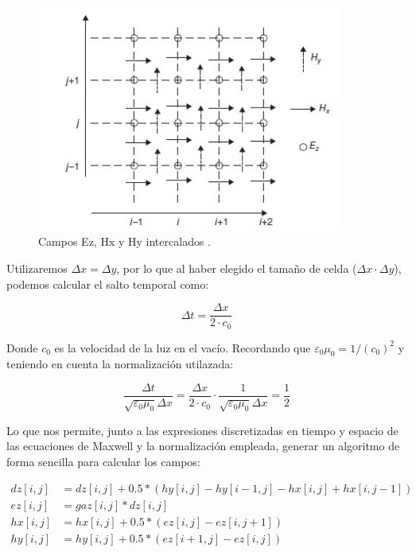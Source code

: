 \documentclass[11pt,a4paper,twoside,pdf]{article}
\numberwithin{equation}{section}
\begin{document}
\begin{figure}[h]
\centering
\includegraphics[width=10cm]{Interleaving_E_H.jpg}				
\caption{Campos Ez, Hx y Hy intercalados \cite{Houle2020}. }
\label{fig:EyH_intercalados}
\end{figure}
\noindent

Utilizaremos $\Delta x = \Delta y$, por lo que al haber elegido el tamaño de celda ($\Delta x \cdot \Delta y$), podemos calcular el salto temporal como:

\begin{equation}
\Delta t=\frac{\Delta x}{2 \cdot c_{0}}
\end{equation}

Donde $c_{0}$ es la velocidad de la luz en el vacío. Recordando que $\varepsilon_{0} \mu_{0}=1/(c_{0})^2$ y teniendo en cuenta la normalización utilazada:

\begin{equation}
    \frac{\Delta t}{\sqrt{\varepsilon_{0} \mu_{0}} \Delta x}=\frac{\Delta x}{2 \cdot c_{0}}\cdot 
     \frac{1}{\sqrt{\varepsilon_{0} \mu_{0}} \Delta x}=\frac{1}{2}
\end{equation}

Lo que nos permite, junto a las expresiones discretizadas en tiempo y espacio de las ecuaciones de Maxwell y la normalización empleada, generar un algoritmo de forma sencilla para calcular los campos:

\begin{align} \label{eq:actualizacion-campos}
    dz[i,j]&=dz[i,j] + 0.5*(hy[i,j]-hy[i-1,j]-hx[i,j]+hx[i,j-1]) \nonumber \\
    ez[i,j]&=gaz[i,j]*dz[i,j] \nonumber \\
    hx[i,j]&=hx[i,j]+0.5*(ez[i,j]-ez[i,j+1]) \nonumber \\
    hy[i,j]&=hy[i,j]+0.5*(ez[i+1,j]-ez[i,j])
\end{align}
\end{document}
